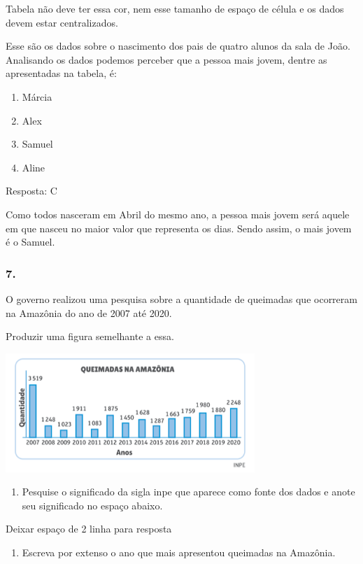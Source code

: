 Tabela não deve ter essa cor, nem esse tamanho de espaço de célula e os
dados devem estar centralizados.

Esse são os dados sobre o nascimento dos pais de quatro alunos da sala
de João. Analisando os dados podemos perceber que a pessoa mais jovem,
dentre as apresentadas na tabela, é:

\begin{enumerate}
\def\labelenumi{\alph{enumi})}
\item
  Márcia
\item
  Alex
\item
  Samuel
\item
  Aline
\end{enumerate}

Resposta: C

Como todos nasceram em Abril do mesmo ano, a pessoa mais jovem será
aquele em que nasceu no maior valor que representa os dias. Sendo assim,
o mais jovem é o Samuel.

\subsubsection{7.}\label{section-97}

O governo realizou uma pesquisa sobre a quantidade de queimadas que
ocorreram na Amazônia do ano de 2007 até 2020.

Produzir uma figura semelhante a essa.

\includegraphics[width=3.71154in,height=1.76937in]{media/image99.png}

\begin{enumerate}
\def\labelenumi{\alph{enumi})}
\item
  Pesquise o significado da sigla inpe que aparece como fonte dos dados
  e anote seu significado no espaço abaixo.
\end{enumerate}

Deixar espaço de 2 linha para resposta

\begin{enumerate}
\def\labelenumi{\alph{enumi})}
\item
  Escreva por extenso o ano que mais apresentou queimadas na Amazônia.
\end{enumerate}

